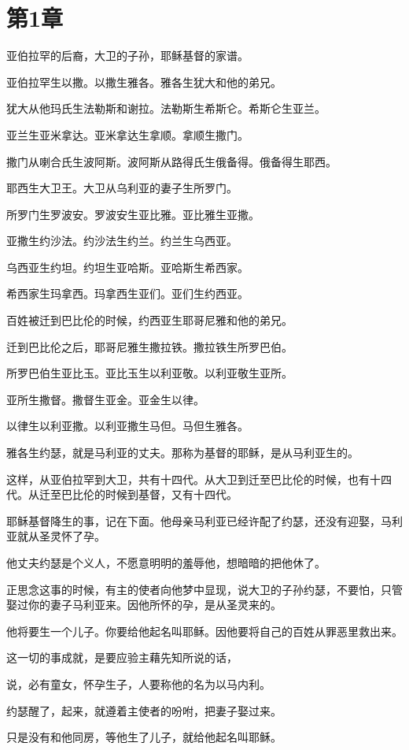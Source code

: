 \documentclass[12pt,oneside]{book}
\begin{document}
\chapter{第1章}
亚伯拉罕的后裔，大卫的子孙，耶稣基督的家谱。

亚伯拉罕生以撒。以撒生雅各。雅各生犹大和他的弟兄。

犹大从他玛氏生法勒斯和谢拉。法勒斯生希斯仑。希斯仑生亚兰。

亚兰生亚米拿达。亚米拿达生拿顺。拿顺生撒门。

撒门从喇合氏生波阿斯。波阿斯从路得氏生俄备得。俄备得生耶西。

耶西生大卫王。大卫从乌利亚的妻子生所罗门。

所罗门生罗波安。罗波安生亚比雅。亚比雅生亚撒。

亚撒生约沙法。约沙法生约兰。约兰生乌西亚。

乌西亚生约坦。约坦生亚哈斯。亚哈斯生希西家。

希西家生玛拿西。玛拿西生亚们。亚们生约西亚。

百姓被迁到巴比伦的时候，约西亚生耶哥尼雅和他的弟兄。

迁到巴比伦之后，耶哥尼雅生撒拉铁。撒拉铁生所罗巴伯。

所罗巴伯生亚比玉。亚比玉生以利亚敬。以利亚敬生亚所。

亚所生撒督。撒督生亚金。亚金生以律。

以律生以利亚撒。以利亚撒生马但。马但生雅各。

雅各生约瑟，就是马利亚的丈夫。那称为基督的耶稣，是从马利亚生的。

这样，从亚伯拉罕到大卫，共有十四代。从大卫到迁至巴比伦的时候，也有十四代。从迁至巴比伦的时候到基督，又有十四代。

耶稣基督降生的事，记在下面。他母亲马利亚已经许配了约瑟，还没有迎娶，马利亚就从圣灵怀了孕。

他丈夫约瑟是个义人，不愿意明明的羞辱他，想暗暗的把他休了。

正思念这事的时候，有主的使者向他梦中显现，说大卫的子孙约瑟，不要怕，只管娶过你的妻子马利亚来。因他所怀的孕，是从圣灵来的。

他将要生一个儿子。你要给他起名叫耶稣。因他要将自己的百姓从罪恶里救出来。

这一切的事成就，是要应验主藉先知所说的话，

说，必有童女，怀孕生子，人要称他的名为以马内利。

约瑟醒了，起来，就遵着主使者的吩咐，把妻子娶过来。

只是没有和他同房，等他生了儿子，就给他起名叫耶稣。
\end{document}
